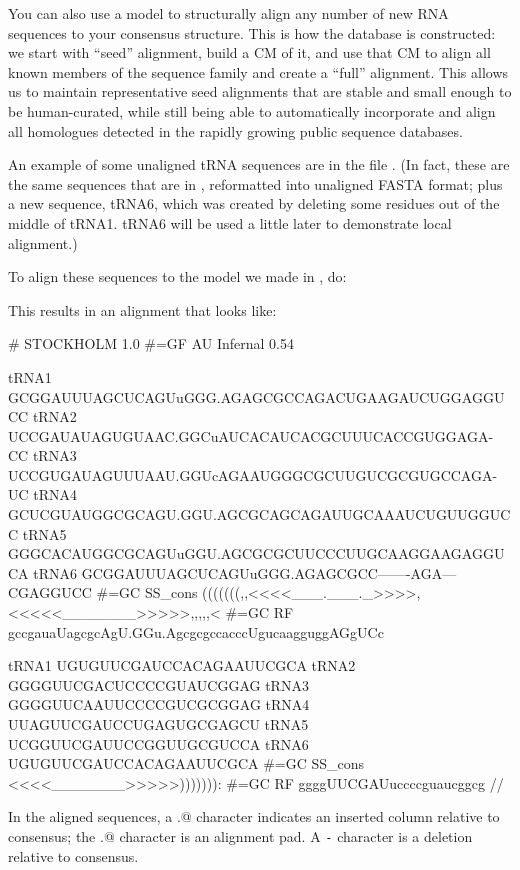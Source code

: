 You can also use a model to structurally align any number of new RNA
sequences to your consensus structure. This is how the 
database is constructed: we start with ``seed'' alignment, build a CM
of it, and use that CM to align all known members of the sequence
family and create a ``full'' alignment. This allows us to maintain
representative seed alignments that are stable and small enough to be
human-curated, while still being able to automatically incorporate and
align all homologues detected in the rapidly growing public sequence
databases.

An example of some unaligned tRNA sequences are in the file
. (In fact, these are the same sequences that are in
, reformatted into unaligned FASTA format; plus a
new sequence, tRNA6, which was created by deleting some residues out
of the middle of tRNA1. tRNA6 will be used a little later to
demonstrate local alignment.)

To align these sequences to the model we made in , do:


This results in an alignment that looks like:

{\samepage
\begin{sreoutput}
# STOCKHOLM 1.0
#=GF AU    Infernal 0.54

tRNA1             GCGGAUUUAGCUCAGUuGGG.AGAGCGCCAGACUGAAGAUCUGGAGGUCC
tRNA2             UCCGAUAUAGUGUAAC.GGCuAUCACAUCACGCUUUCACCGUGGAGA-CC
tRNA3             UCCGUGAUAGUUUAAU.GGUcAGAAUGGGCGCUUGUCGCGUGCCAGA-UC
tRNA4             GCUCGUAUGGCGCAGU.GGU.AGCGCAGCAGAUUGCAAAUCUGUUGGUCC
tRNA5             GGGCACAUGGCGCAGUuGGU.AGCGCGCUUCCCUUGCAAGGAAGAGGUCA
tRNA6             GCGGAUUUAGCUCAGUuGGG.AGAGCGCC-------AGA---CGAGGUCC
#=GC SS_cons      (((((((,,<<<<___.___._>>>>,<<<<<_______>>>>>,,,,,<
#=GC RF           gccgauaUagcgcAgU.GGu.AgcgcgccacccUgucaagguggAGgUCc

tRNA1             UGUGUUCGAUCCACAGAAUUCGCA
tRNA2             GGGGUUCGACUCCCCGUAUCGGAG
tRNA3             GGGGUUCAAUUCCCCGUCGCGGAG
tRNA4             UUAGUUCGAUCCUGAGUGCGAGCU
tRNA5             UCGGUUCGAUUCCGGUUGCGUCCA
tRNA6             UGUGUUCGAUCCACAGAAUUCGCA
#=GC SS_cons      <<<<_______>>>>>))))))):
#=GC RF           ggggUUCGAUuccccguaucggcg
//
\end{sreoutput}
}

In the aligned sequences, a \verb@.@ character indicates an inserted
column relative to consensus; the \verb@.@ character is an alignment
pad. A \verb+-+ character is a deletion relative to consensus.


